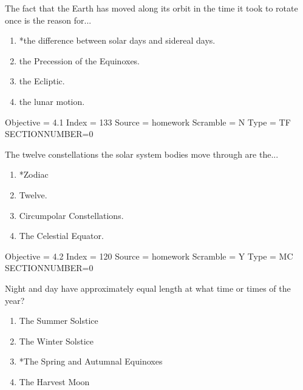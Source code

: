 \documentclass[11pt]{article}
\begin{document}
\begin{enumerate}
\begin{minipage}{\textwidth}
\begin{minipage}{\textwidth}
\item The fact that the Earth has moved along its orbit in the time it took to rotate once is the reason for...
\begin{enumerate} 
\setlength{\itemsep}{1pt} 
\setlength{\parskip}{0pt} 
\setlength{\parsep}{0pt}
\setlength{\multicolsep}{1pt} 
\item *the difference between solar days and sidereal days.
\item the Precession of the Equinoxes.
\item the Ecliptic.
\item the lunar motion.
\end{enumerate} 
Objective = 4.1
Index = 133
Source = homework
Scramble = N
Type = TF
SECTIONNUMBER=0
\end{minipage}
\end{minipage}
\vskip 0.20in

\begin{minipage}{\textwidth}
\begin{minipage}{\textwidth}
\item The twelve constellations the solar system bodies move through are the...
\begin{multicols}{2}
\begin{enumerate} 
\setlength{\itemsep}{1pt} 
\setlength{\parskip}{0pt} 
\setlength{\parsep}{0pt}
\setlength{\multicolsep}{1pt} 
\item *Zodiac
\item Twelve.
\item Circumpolar Constellations.
\item The Celestial Equator.
\end{enumerate} 
\vfill 
\end{multicols}

Objective = 4.2
Index = 120
Source = homework
Scramble = Y
Type = MC
SECTIONNUMBER=0
\end{minipage}
\end{minipage}
\vskip 0.20in

\begin{minipage}{\textwidth}
\begin{minipage}{\textwidth}
\item Night and day have approximately equal length at what time or times of the year?
\begin{multicols}{2}
\begin{enumerate} 
\setlength{\itemsep}{1pt} 
\setlength{\parskip}{0pt} 
\setlength{\parsep}{0pt}
\setlength{\multicolsep}{1pt} 
\item The Summer Solstice
\item The Winter Solstice
\item *The Spring and Autumnal Equinoxes
\item The Harvest Moon
\end{enumerate} 
\vfill 
\end{multicols}


\end{minipage}
\end{minipage}
\end{enumerate}
\end{document}
